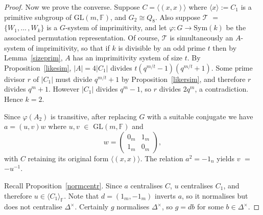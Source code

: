 \documentclass[10pt,a4paper]{amsart}
\begin{document}
\begin{proof}
 Now we prove the converse. Suppose 
 $C = \langle (x,x) \rangle$ where 
 $\langle x \rangle := C_1$ is a primitive subgroup of 
 $\mathrm{GL}(m, \mathbb{F})$, and $G_2 \cong Q_8$.
 Also suppose $\mathcal{T}$ $=$ $\{  W_1 , \ldots \, \! ,  W_k\}$
 is a $G$-system of imprimitivity, and let $\varphi
 : G \rightarrow \mathrm{Sym}(k)$ be the associated 
 permutation representation.
 Of course, $\mathcal{T}$ is simultaneously an $A$-system of 
 imprimitivity, so that
 if $k$ is divisible by an odd prime $t$
 then by Lemma~\ref{sizeprim}, $A$ has an imprimitivity 
 system of size $t$.
 By Proposition~\ref{likesim}, $|A| = 4|C_1|$ divides 
 $t(q^{m/t}-1)(q^{m/t}+1)$.  
 Some prime divisor $r$ of $|C_1|$ must divide $q^{m/t}+1$
 by Proposition~\ref{likersim}, and therefore $r$ divides $q^m+1$.
 However $|C_1|$ divides $q^m-1$, so $r$ divides $2q^m$, 
 a contradiction. 
 Hence $k=2$.
% 
%
%
%
 
 Since
 $\varphi(A_2)$ is transitive, after replacing $G$ 
 with a suitable conjugate we have $a = (u, v) w$
 where $u, v$ $\in$ $\mathrm{GL}(m, \mathbb{F})$ and
$$
 w = 
 \left( \begin{array}{cc}
 0_m & 1_m \\
  1_m & 0_m 
 \end{array}
 \right) ,
$$
 with $C$ retaining its original form
 $\langle (x,x) \rangle$. The relation 
 $a^2 = -1_n$ yields $v$ $=$ $-u ^{-1}$.

 Recall Proposition~\ref{normcentr}.
 Since $a$ centralises $C$, $u$ centralises $C_1$,
 and therefore $u \in \langle C_1\rangle_\mathbb{F}$.
 Note that $d =  (1_m, -1_m)$ inverts $a$, so
  it normalises but does not centralise 
 $\Delta^{\! \times}$. Certainly $g$ normalises  
 $\Delta^{\! \times}$, so
  $g = db$ for some $b \in \Delta^{\! \times}$.
 

\end{proof}
\end{document}
